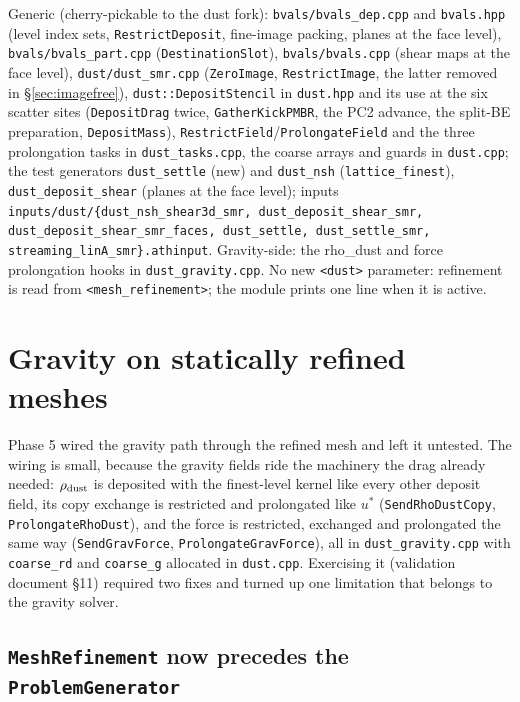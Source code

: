 \documentclass[11pt]{article}
\newcommand{\code}[1]{\texttt{#1}}
\newcommand{\file}[1]{\texttt{\small #1}}
\newcommand{\fn}[1]{\texttt{\small #1}}
\begin{document}
Generic (cherry-pickable to the dust fork): \file{bvals/bvals\_dep.cpp} and
\file{bvals.hpp} (level index sets, \fn{RestrictDeposit}, fine-image packing, planes at the
face level), \file{bvals/bvals\_part.cpp} (\fn{DestinationSlot}), \file{bvals/bvals.cpp}
(shear maps at the face level), \file{dust/dust\_smr.cpp} (\fn{ZeroImage},
\fn{RestrictImage}, the latter removed in \S\ref{sec:imagefree}), \fn{dust::DepositStencil} in \file{dust.hpp} and its use at the six
scatter sites (\fn{DepositDrag} twice, \fn{GatherKickPMBR}, the PC2 advance, the split-BE
preparation, \fn{DepositMass}), \fn{RestrictField}/\fn{ProlongateField} and the three
prolongation tasks in \file{dust\_tasks.cpp}, the coarse arrays and guards in
\file{dust.cpp}; the test generators \code{dust\_settle} (new) and \code{dust\_nsh}
(\code{lattice\_finest}), \code{dust\_deposit\_shear} (planes at the face level); inputs
\file{inputs/dust/\{dust\_nsh\_shear3d\_smr, dust\_deposit\_shear\_smr,
dust\_deposit\_shear\_smr\_faces, dust\_settle, dust\_settle\_smr, streaming\_linA\_smr\}.athinput}.
Gravity-side: the rho\_dust and force prolongation hooks in \file{dust\_gravity.cpp}. No
new \code{<dust>} parameter: refinement is read from \code{<mesh\_refinement>}; the module
prints one line when it is active.

\section{Gravity on statically refined meshes}
\label{sec:gravsmr}

Phase 5 wired the gravity path through the refined mesh and left it untested. The wiring
is small, because the gravity fields ride the machinery the drag already needed:
$\rho_{\rm dust}$ is deposited with the finest-level kernel like every other deposit
field, its copy exchange is restricted and prolongated like $u^*$
(\fn{SendRhoDustCopy}, \fn{ProlongateRhoDust}), and the force is restricted, exchanged
and prolongated the same way (\fn{SendGravForce}, \fn{ProlongateGravForce}), all in
\file{dust\_gravity.cpp} with \code{coarse\_rd} and \code{coarse\_g} allocated in
\file{dust.cpp}. Exercising it (validation document \S11) required two
fixes and turned up one limitation that belongs to the gravity solver.

\subsection{\fn{MeshRefinement} now precedes the \fn{ProblemGenerator}}
\end{document}

